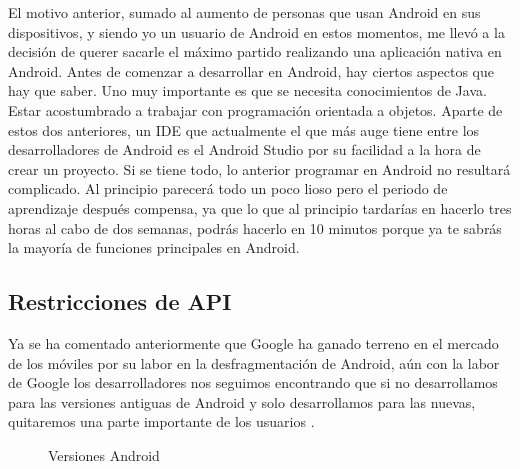 El motivo anterior, sumado al aumento de personas que usan Android en sus dispositivos, y siendo yo un usuario de Android en estos momentos, me llevó a la decisión de querer sacarle el máximo partido realizando una aplicación nativa en Android.
Antes de comenzar a desarrollar en Android, hay ciertos aspectos que hay que saber.
Uno muy importante es que se necesita conocimientos de Java.
Estar acostumbrado a trabajar con programación orientada a objetos.
Aparte de estos dos anteriores, un IDE que actualmente el que más auge tiene entre los desarrolladores de Android es el Android Studio por su facilidad a la hora de crear un proyecto.
Si se tiene todo, lo anterior programar en Android no resultará complicado. Al principio parecerá todo un poco lioso pero el periodo de aprendizaje después compensa, ya que lo que al principio tardarías en hacerlo tres horas al cabo de dos semanas, podrás hacerlo en 10 minutos porque ya te sabrás la mayoría de funciones principales en Android.


\subsection{Restricciones de API}
\label{subsecc:Restricciones de API}

Ya se ha comentado anteriormente que Google ha ganado terreno en el mercado de los móviles por su labor en la desfragmentación de Android, aún con la labor de Google los desarrolladores nos seguimos encontrando que si no desarrollamos para las versiones antiguas de Android y solo desarrollamos para las nuevas, quitaremos una parte importante de los usuarios \cite{dashboards}.

\begin{figure}[H] 
  \begin{center} 
    \caption{Versiones Android} 
    \label{fig:VersionesAndroid2} 
  \end{center} 
\end{figure}

